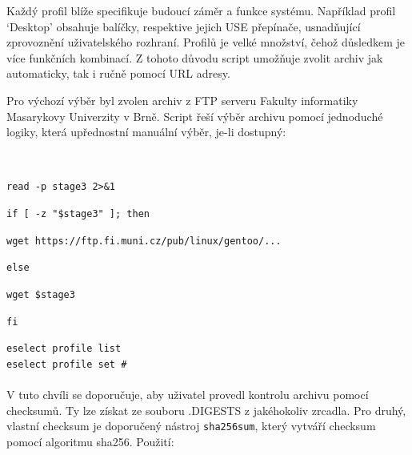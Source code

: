 \documentclass[12pt,a4paper,twoside,]{article}
\begin{document}
{{Každý profil blíže specifikuje budoucí záměr a funkce systému. Například profil
‘Desktop’ obsahuje balíčky, respektive jejich USE přepínače, usnadňující zprovoznění uživatelského rozhraní.
Profilů je velké množství, čehož důsledkem je více funkčních kombinací. Z tohoto důvodu script umožňuje zvolit archiv jak automaticky, tak i ručně pomocí URL adresy. 

Pro výchozí výběr byl zvolen archiv z FTP serveru Fakulty informatiky
Masarykovy Univerzity v Brně. Script řeší výběr archivu pomocí jednoduché logiky,
která upřednostní manuální výběr, je-li dostupný:}\\

{\hspace*{+1.5em}\texttt{read -p stage3 2>\&1}\\
{\hspace*{+1.5em}\texttt{if [ -z "\$stage3" ]; then}\\
{\hspace*{+1.5em}\texttt{\hspace*{+1.5em}wget https://ftp.fi.muni.cz/pub/linux/gentoo/...\\}
{\hspace*{+1.5em}\texttt{else}\\
{\hspace*{+1.5em}\texttt{\hspace*{+1.5em}wget \$stage3}\\
{\hspace*{+1.5em}\texttt{fi}\\

\hspace{-1.5em}{Nesprávně zvolený profil lze po dokončení instalace změnit pomocí:\\}

\texttt{eselect profile list}\\
\texttt{\hspace*{--1.5em}eselect profile set \#}\\

\hspace{-1.5em}{Uživatel by však měl mít na paměti, že změna profilu může, v některých případech
vést až k překompilování celého systému.}\\

\hspace{-1.5em}V tuto chvíli se doporučuje, aby uživatel provedl kontrolu archivu pomocí checksumů.
Ty lze získat ze souboru .DIGESTS z jakéhokoliv zrcadla. Pro druhý, vlastní checksum je doporučený nástroj \texttt{sha256sum}, který vytváří checksum pomocí algoritmu sha256. Použití:

}}}}}}}
\end{document}

